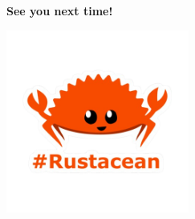 \documentclass[aspectratio=1610,t]{beamer}
\begin{document}

\begin{frame}
\center\Huge\textbf{See you next time!}

\includegraphics[height=6cm,keepaspectratio]{images/rustacean.png}
\end{frame}

\end{document}
